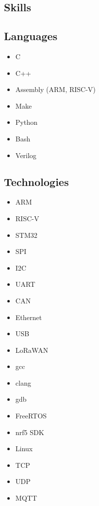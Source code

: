 \documentclass[lighthipster]{styles}
\begin{document}
\begin{paracol}{2}
{\vspace{0.05cm}

\section*{\textbf{Skills}}
\subsection*{Languages}
\vspace{-0.2cm}
\begin{multicols}{2}
    \begin{itemize}
        \item C
        \item C++
        \item Assembly (ARM, RISC-V)
        \item Make
        \item Python
        \item Bash
        \item Verilog
    \end{itemize}
\end{multicols}

\subsection*{Technologies}
\vspace{-0.2cm}
\begin{multicols}{2}
    \begin{itemize}
        \item ARM
        \item RISC-V
        \item STM32
        \item SPI
        \item I2C
        \item UART
        \item CAN
        \item Ethernet
        \item USB
        \item LoRaWAN
        \item gcc
        \item clang
        \item gdb
        \item FreeRTOS
        \item nrf5 SDK
        \item Linux
        \item TCP
        \item UDP
        \item MQTT
    \end{itemize}
\end{multicols}

}
\end{paracol}
\end{document}
